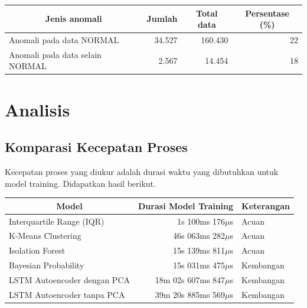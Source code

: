 \begin{table}[h]
    \centering
    \begin{tabular}{|l|r|r|r|}
        \hline
        \multicolumn{1}{|c|}{\textbf{Jenis anomali}} & \multicolumn{1}{c|}{\textbf{Jumlah}} & \multicolumn{1}{c|}{\textbf{Total data}} & \multicolumn{1}{c|}{\textbf{Persentase (\%)}} \\ \hline
        Anomali pada data NORMAL                     & 34.527                                & 160.430                                   & 22                                       \\ \hline
        Anomali pada data selain NORMAL              & 2.567                                 & 14.454                                    & 18                                       \\ \hline
    \end{tabular}
\end{table}

\section{Analisis} \label{ANALISIS}
\subsection{Komparasi Kecepatan Proses}
Kecepatan proses yang diukur adalah durasi waktu yang dibutuhkan untuk model training. Didapatkan hasil berikut.

\begin{table}[h]
    \centering
    \begin{tabular}{|l|r|l|}
        \hline
        \multicolumn{1}{|c|}{\textbf{Model}} & \multicolumn{1}{c|}{\textbf{Durasi Model Training}} & \multicolumn{1}{c|}{\textbf{Keterangan}} \\ \hline
        Interquartile Range (IQR)   & 1s 100ms 176$\mu$s      & Acuan     \\ \hline
        K-Means Clustering          & 46s 063ms 282$\mu$s     & Acuan     \\ \hline
        Isolation Forest            & 15s 139ms 811$\mu$s     & Acuan     \\ \hline
        Bayesian Probability        & 15s 031ms 475$\mu$s     & Kembangan \\ \hline
        LSTM Autoencoder dengan PCA & 18m 02s 607ms 847$\mu$s & Kembangan \\ \hline
        LSTM Autoencoder tanpa PCA  & 39m 20s 885ms 569$\mu$s & Kembangan \\ \hline
    \end{tabular}
\end{table}

